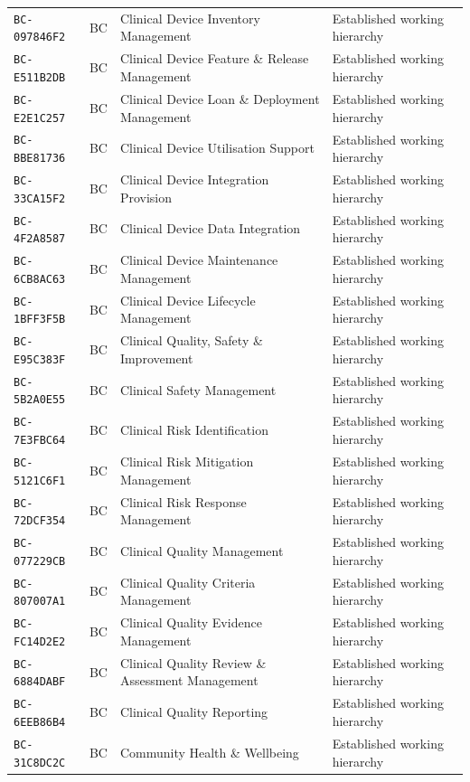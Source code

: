 \documentclass[11pt,a4paper,openany]{book}
\begin{document}
\begin{longtable}{@{}p{.19\linewidth}p{.12\linewidth}p{.39\linewidth}p{.24\linewidth}@{}}
\texttt{BC-097846F2} & BC & Clinical Device Inventory Management & Established working hierarchy \\
\texttt{BC-E511B2DB} & BC & Clinical Device Feature \& Release Management & Established working hierarchy \\
\texttt{BC-E2E1C257} & BC & Clinical Device Loan \& Deployment Management & Established working hierarchy \\
\texttt{BC-BBE81736} & BC & Clinical Device Utilisation Support & Established working hierarchy \\
\texttt{BC-33CA15F2} & BC & Clinical Device Integration Provision & Established working hierarchy \\
\texttt{BC-4F2A8587} & BC & Clinical Device Data Integration & Established working hierarchy \\
\texttt{BC-6CB8AC63} & BC & Clinical Device Maintenance Management & Established working hierarchy \\
\texttt{BC-1BFF3F5B} & BC & Clinical Device Lifecycle Management & Established working hierarchy \\
\texttt{BC-E95C383F} & BC & Clinical Quality, Safety \& Improvement & Established working hierarchy \\
\texttt{BC-5B2A0E55} & BC & Clinical Safety Management & Established working hierarchy \\
\texttt{BC-7E3FBC64} & BC & Clinical Risk Identification & Established working hierarchy \\
\texttt{BC-5121C6F1} & BC & Clinical Risk Mitigation Management & Established working hierarchy \\
\texttt{BC-72DCF354} & BC & Clinical Risk Response Management & Established working hierarchy \\
\texttt{BC-077229CB} & BC & Clinical Quality Management & Established working hierarchy \\
\texttt{BC-807007A1} & BC & Clinical Quality Criteria Management & Established working hierarchy \\
\texttt{BC-FC14D2E2} & BC & Clinical Quality Evidence Management & Established working hierarchy \\
\texttt{BC-6884DABF} & BC & Clinical Quality Review \& Assessment Management & Established working hierarchy \\
\texttt{BC-6EEB86B4} & BC & Clinical Quality Reporting & Established working hierarchy \\
\texttt{BC-31C8DC2C} & BC & Community Health \& Wellbeing & Established working hierarchy \\

\end{longtable}
\end{document}
